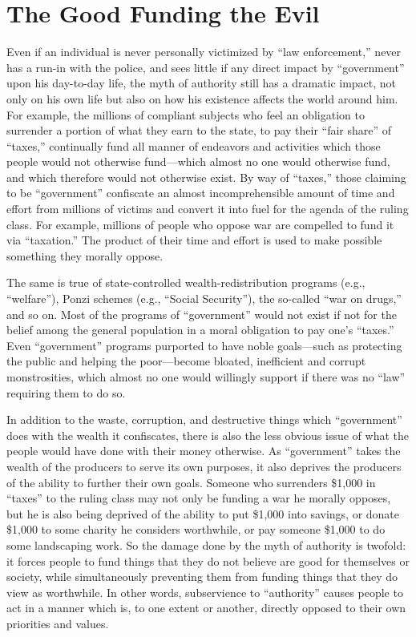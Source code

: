 \documentclass{book}
\begin{document}
\section{The Good Funding the Evil}

Even if an individual is never personally victimized by \enquote{law enforcement,} never has a run-in with the police, and sees little if any direct impact by \enquote{government} upon his day-to-day life, the myth of authority still has a dramatic impact, not only on his own life but also on how his existence affects the world around him. For example, the millions of compliant subjects who feel an obligation to surrender a portion of what they earn to the state, to pay their \enquote{fair share} of \enquote{taxes,} continually fund all manner of endeavors and activities which those people would not otherwise fund---which almost no one would otherwise fund, and which therefore would not otherwise exist. By way of \enquote{taxes,} those claiming to be \enquote{government} confiscate an almost incomprehensible amount of time and effort from millions of victims and convert it into fuel for the agenda of the ruling class. For example, millions of people who oppose war are compelled to fund it via \enquote{taxation.} The product of their time and effort is used to make possible something they morally oppose.

The same is true of state-controlled wealth-redistribution programs (e.g., \enquote{welfare}), Ponzi schemes (e.g., \enquote{Social Security}), the so-called \enquote{war on drugs,} and so on. Most of the programs of \enquote{government} would not exist if not for the belief among the general population in a moral obligation to pay one's \enquote{taxes.} Even \enquote{government} programs purported to have noble goals---such as protecting the public and helping the poor---become bloated, inefficient and corrupt monstrosities, which almost no one would willingly support if there was no \enquote{law} requiring them to do so.

In addition to the waste, corruption, and destructive things which \enquote{government} does with the wealth it confiscates, there is also the less obvious issue of what the people would have done with their money otherwise. As \enquote{government} takes the wealth of the producers to serve its own purposes, it also deprives the producers of the ability to further their own goals. Someone who surrenders \$1,000 in \enquote{taxes} to the ruling class may not only be funding a war he morally opposes, but he is also being deprived of the ability to put \$1,000 into savings, or donate \$1,000 to some charity he considers worthwhile, or pay someone \$1,000 to do some landscaping work. So the damage done by the myth of authority is twofold: it forces people to fund things that they do not believe are good for themselves or society, while simultaneously preventing them from funding things that they do view as worthwhile. In other words, subservience to \enquote{authority} causes people to act in a manner which is, to one extent or another, directly opposed to their own priorities and values.
\end{document}

